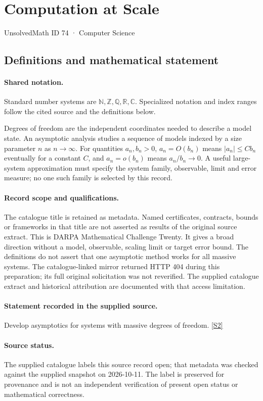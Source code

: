 \documentclass[11pt]{article}
\newcommand{\sref}[2]{\hyperlink{source:#1:#2}{[S#2]}}
\begin{document}
\setcounter{section}{73}
\section{Computation at Scale}\label{74}
{\small\sffamily UnsolvedMath ID 74 · Computer Science}
\subsection{Definitions and mathematical statement}

\paragraph{Shared notation.}Standard number systems are $\mathbb N,\mathbb Z,\mathbb Q,\mathbb R,\mathbb C$. Specialized notation and index ranges follow the cited source and the definitions below.


Degrees of freedom are the independent coordinates needed to describe a model state. An asymptotic analysis studies a sequence of models indexed by a size parameter $n$ as $n\to\infty$. For quantities $a_n,b_n>0$, $a_n=O(b_n)$ means $|a_n|\leq Cb_n$ eventually for a constant $C$, and $a_n=o(b_n)$ means $a_n/b_n\to0$. A useful large-system approximation must specify the system family, observable, limit and error measure; no one such family is selected by this record.
\paragraph{Record scope and qualifications.}
The catalogue title is retained as metadata. Named certificates, contracts, bounds or frameworks in that title are not asserted as results of the original source extract.
This is DARPA Mathematical Challenge Twenty. It gives a broad direction without a model, observable, scaling limit or target error bound. The definitions do not assert that one asymptotic method works for all massive systems. The catalogue-linked mirror returned HTTP 404 during this preparation; its full original solicitation was not reverified. The supplied catalogue extract and historical attribution are documented with that access limitation.
\paragraph{Statement recorded in the supplied source.}
Develop asymptotics for systems with massive degrees of freedom. \sref{74}{2}
\paragraph{Source status.}
The supplied catalogue labels this source record open; that metadata was checked against the supplied snapshot on 2026-10-11. The label is preserved for provenance and is not an independent verification of present open status or mathematical correctness.
\end{document}
